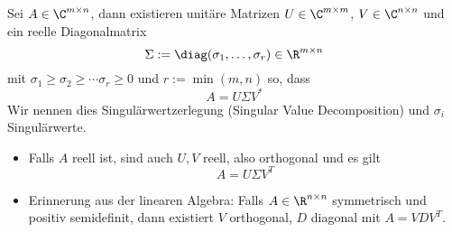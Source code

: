 \documentclass[11pt]{scrbook}
\begin{document}
\begin{st}
	\label{1.37}
	Sei $A\in \C^{m\times n}$, dann existieren unitäre Matrizen $U\in \C^{m\times m}$, $V\in \C^{n\times n}$ und ein reelle Diagonalmatrix
	\[
		\Sigma := \diag( \sigma_1, \dotsc, \sigma_r)  \in \R^{m\times n}
	\]
	mit $\sigma_1\ge \sigma_2 \ge \dotsb \sigma_r \ge 0$ und $r:= \min(m,n)$ so, dass
	\[
		A = U \Sigma V^*
	\]
	Wir nennen dies Singulärwertzerlegung (Singular Value Decomposition) und $\sigma_i$ Singulärwerte.
	\begin{note}
		\begin{itemize}
			\item
				Falls $A$ reell ist, sind auch $U,V$ reell, also orthogonal und es gilt
				\[
					A=U\Sigma V^T
				\]
			\item
				Erinnerung aus der linearen Algebra:
				Falls $A \in \R^{n\times n}$ symmetrisch und positiv semidefinit, dann existiert $V$ orthogonal, $D$ diagonal mit $A=VDV^T$.


\end{itemize}
\end{note}
\end{st}
\end{document}
